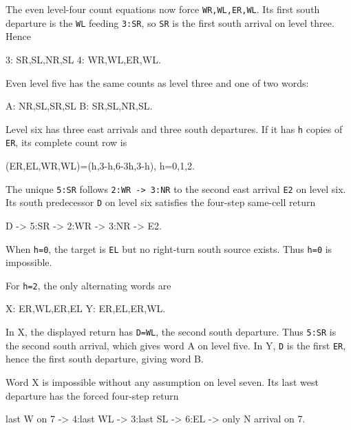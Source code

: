 \documentclass[11pt,letterpaper]{article}
\theoremstyle{plain}
\theoremstyle{definition}
\begin{document}
\begin{NoHyper}
The even level-four count equations now force \texttt{WR,WL,ER,WL}. Its first south departure is the \texttt{WL} feeding \texttt{3:SR}, so \texttt{SR} is the first south arrival on level three. Hence

\begin{codeblock}
3: SR,SL,NR,SL
4: WR,WL,ER,WL.
\end{codeblock}

Even level five has the same counts as level three and one of two words:

\begin{codeblock}
A: NR,SL,SR,SL
B: SR,SL,NR,SL.
\end{codeblock}

Level six has three east arrivals and three south departures. If it has \texttt{h} copies of \texttt{ER}, its complete count row is

\begin{codeblock}
(ER,EL,WR,WL)=(h,3-h,6-3h,3-h),       h=0,1,2.
\end{codeblock}

The unique \texttt{5:SR} follows \texttt{2:WR\ -\textgreater{}\ 3:NR} to the second east arrival \texttt{E2} on level six. Its south predecessor \texttt{D} on level six satisfies the four-step same-cell return

\begin{codeblock}
D -> 5:SR -> 2:WR -> 3:NR -> E2.
\end{codeblock}

When \texttt{h=0}, the target is \texttt{EL} but no right-turn south source exists. Thus \texttt{h=0} is impossible.

For \texttt{h=2}, the only alternating words are

\begin{codeblock}
X: ER,WL,ER,EL
Y: ER,EL,ER,WL.
\end{codeblock}

In X, the displayed return has \texttt{D=WL}, the second south departure. Thus \texttt{5:SR} is the second south arrival, which gives word A on level five. In Y, \texttt{D} is the first \texttt{ER}, hence the first south departure, giving word B.

Word X is impossible without any assumption on level seven. Its last west departure has the forced four-step return

\begin{codeblock}
last W on 7 -> 4:last WL -> 3:last SL -> 6:EL -> only N arrival on 7.
\end{codeblock}


\end{NoHyper}
\end{document}
